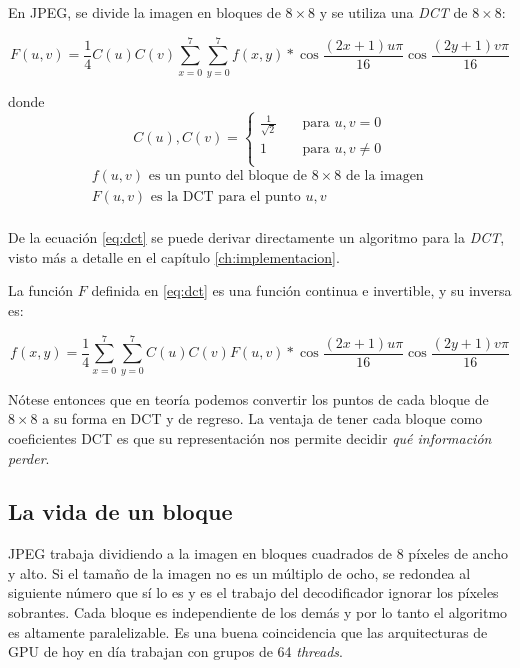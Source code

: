 En JPEG, se divide la imagen en bloques de $8\times8$ y se utiliza una
\emph{DCT} de $8\times8$:

\begin{equation}\label{eq:dct}
F(u, v) = \frac{1}{4} C(u)C(v) \sum_{x=0}^{7}\sum_{y=0}^{7}
f(x,y)*\cos{\frac{(2x+1)u\pi}{16}}\cos{\frac{(2y+1)v\pi}{16}}
\end{equation}

donde \[C(u), C(v) = \begin{cases}
        \frac{1}{\sqrt{2}} & \quad \text{para } u,v = 0\\
        1                  & \quad \text{para } u,v \neq 0\\
\end{cases} \]
\begin{eqnarray*}
    f(u, v) \text{ es un punto del bloque de } 8\times8 \text{ de la imagen }\\
    F(u, v) \text{ es la DCT para el punto } u,v\\
\end{eqnarray*}

De la ecuación \ref{eq:dct} se puede derivar directamente un algoritmo para la
\emph{DCT}, visto más a detalle en el capítulo \ref{ch:implementacion}.

La función $F$ definida en \ref{eq:dct} es una función continua e invertible, y
su inversa es:

\begin{equation}\label{eq:dct}
f(x, y) = \frac{1}{4} \sum_{x=0}^{7}\sum_{y=0}^{7} C(u)C(v) F(u, v)*
\cos{\frac{(2x+1)u\pi}{16}}\cos{\frac{(2y+1)v\pi}{16}}
\end{equation}

Nótese entonces que en teoría podemos convertir los puntos de cada bloque de $8\times8$ a su forma en DCT y de regreso. La ventaja de tener cada bloque como coeficientes DCT es que su representación nos permite decidir \emph{qué información perder}.

\subsection{La vida de un bloque}\label{sub:vida}


JPEG trabaja dividiendo a la imagen en bloques cuadrados de 8 píxeles de ancho
y alto. Si el tamaño de la imagen no es un múltiplo de ocho, se redondea al
siguiente número que sí lo es y es el trabajo del decodificador ignorar los
píxeles sobrantes. Cada bloque es independiente de los demás y por lo tanto el
algoritmo es altamente paralelizable. Es una buena coincidencia que las
arquitecturas de GPU de hoy en día trabajan con grupos de 64 \emph{threads}.

